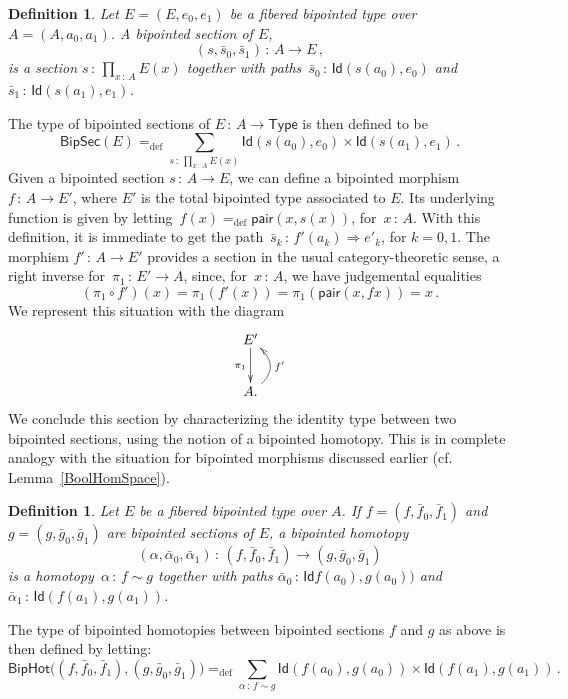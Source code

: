 \documentclass[10pt,a4paper,oneside,reqno]{amsart}
\theoremstyle{mythm}
\theoremstyle{mydef}
\newtheorem{definition}[theorem]{Definition}
\theoremstyle{myrmk}
\newcommand{\ie}{\text{i.e.\ }}
\newcommand{\deq}{=}
\newcommand{\defeq}{=_{\mathrm{def}}}
\newcommand{\co}{\,{:}\,}
\newcommand{\Id}{\mathsf{Id}}
\newcommand{\pair}{\mathsf{pair}}
\newcommand{\U}{\mathsf{Type}}
\newcommand{\BipHot}{\mathsf{BipHot}}
\newcommand{\BipSec}{\mathsf{BipSec}}
\begin{document}
\begin{definition} \label{def:fibsection} Let $E = (E, e_0, e_1)$ be a fibered bipointed type over
$A = (A, a_0, a_1)$.  A \emph{bipointed section} of $E$, 
\[
(s, \bar{s}_0, \bar{s}_1) \co A \to E \, ,
\]
is a section $s \co \prod_{x \co A} E(x)$ together with paths~$\bar{s}_0 \co \Id(s(a_0), e_0)$ 
and $\bar{s}_1 \co  \Id( s(a_1) , e_1)$. 
\end{definition} 


The type of bipointed sections of $E \co A \to \U$ is then defined to be
\[
\BipSec(E) \defeq \sum_{s \co \prod_{x \co A} E(x)} \Id(s(a_0),  e_0)  \times \Id( s(a_1), e_1)  \, .
\]
Given a bipointed section $s \co A \to E$, we can define a bipointed morphism~$f  \co A \to E'$, where $E'$ is the
total bipointed type associated to $E$. Its underlying function is given by 
letting~$f(x) \defeq \pair(x, s(x))$, for~$x \co A$. With this definition, it is 
immediate to get the path~$\bar{s}_k \co f'(a_k) \Rightarrow e'_k$, for $k = 0, 1$.
The morphism $f' \co A \to E'$ provides a section in the usual category-theoretic sense, \ie a right inverse for~$\pi_1 \co E' \to A$,
 since, for~$x \co A$, we have judgemental equalities
\[
 (\pi_1 \circ f')(x) \deq \pi_1 (f'(x)) \deq \pi_1 (\pair(x, f x)) \deq x \, .
\]
 We represent this situation with the diagram
\[
\xymatrix{
E' \ar[d]_{\pi_1} \\
A . \ar@/_1.2pc/[u]_{f'} }
\]
We conclude this section by characterizing the identity type between two bipointed sections, using
the notion of a bipointed homotopy. This is in complete analogy with the situation for bipointed
morphisms discussed earlier (cf.\,Lemma~\ref{BoolHomSpace}). 


\begin{definition} \label{def:2cellsection} Let $E$ be a fibered bipointed type over $A$. If $f = (f, \bar{f}_0,\bar{f}_1)$ and $g = (g, \bar{g}_0, \bar{g}_1)$ are bipointed sections of $E$, a \emph{bipointed homotopy} 
\[
(\alpha, \bar{\alpha}_0, \bar{\alpha}_1) \co (f, \bar{f}_0, \bar{f}_1)  \rightarrow (g, \bar{g}_0, \bar{g}_1)
\]
is a homotopy~$\alpha \co f \sim g$ together with paths $\bar{\alpha}_0 \co \Id  f(a_0) ,  g(a_0))$ and 
$\bar{\alpha}_1 \co \Id( f(a_1),  g(a_1))$. 
\end{definition} 

The type of bipointed homotopies between bipointed sections $f$ and $g$ as above is then defined by letting:
\[
\BipHot \big( (f, \bar{f}_0, \bar{f}_1), (g, \bar{g}_0, \bar{g}_1) \big) \defeq
\sum_{\alpha \co f \sim g} \Id ( f(a_0), g(a_0) ) \times \Id ( f(a_1) , g(a_1) ) \, .
\]
\end{document}

